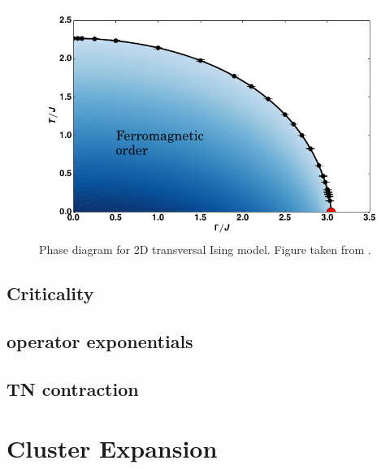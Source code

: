 \documentclass[twocolumn]{article}
\newcounter{a}
\newcounter{b}
\begin{document}
\begin{figure}[h!]
    \center
    \includegraphics[width=\linewidth]{../Figuren/phsyics/2disingphase.png}
    \caption{Phase diagram for 2D transversal Ising model. Figure taken from \cite{Hesselmann2016}.}
    \label{2dtisingphasediag}
\end{figure}

\subsection{Criticality}

\subsection{operator exponentials}

\subsection{TN contraction}

\section{Cluster Expansion}
\end{document}

